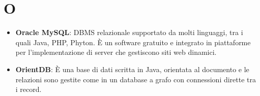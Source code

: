 \section{O}
\begin{itemize}
	\item \textbf{Oracle MySQL}: DBMS relazionale supportato da molti linguaggi, tra i quali Java, PHP, Phyton. \MakeUppercase{è} un software gratuito e integrato in piattaforme per l'implementazione di server che gestiscono siti web dinamici.
	\item \textbf{OrientDB}: È una base di dati scritta in Java, orientata al documento e le relazioni sono gestite come in un database a grafo con connessioni dirette tra i record. 
\end{itemize}